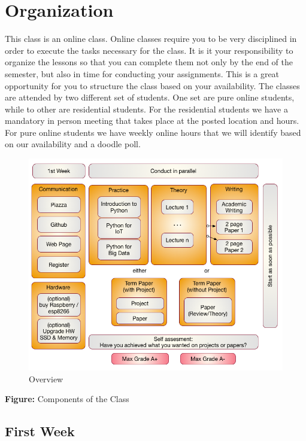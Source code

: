 \FILENAME

\section{Organization}\label{organization}

This class is an online class. Online classes require you to be very
disciplined in order to execute the tasks necessary for the class. It is
it your responsibility to organize the lessons so that you can complete
them not only by the end of the semester, but also in time for
conducting your assignments. This is a great opportunity for you to
structure the class based on your availability. The classes are attended
by two different set of students. One set are pure online students,
while to other are residential students. For the residential students we
have a mandatory in person meeting that takes place at the posted
location and hours. For pure online students we have weekly online hours
that we will identify based on our availability and a doodle poll.

\begin{figure}
\centering
\includegraphics[width=\textwidth]{../../images/i523-overview.png}
\caption{Overview}
\end{figure}

\textbf{Figure:} Components of the Class

\subsection{First Week}\label{first-week}

